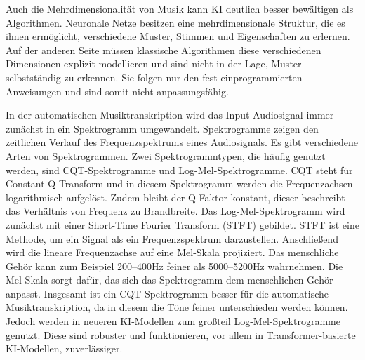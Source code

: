 Auch die Mehrdimensionalität von Musik kann KI deutlich besser bewältigen als Algorithmen.
Neuronale Netze besitzen eine mehrdimensionale Struktur, die es ihnen ermöglicht,
verschiedene Muster, Stimmen und Eigenschaften zu erlernen.
\cite{graves2007multi}
Auf der anderen Seite müssen klassische Algorithmen diese verschiedenen Dimensionen
explizit modellieren und sind nicht in der Lage, Muster selbstständig zu erkennen.
Sie folgen nur den fest einprogrammierten Anweisungen und sind somit nicht anpassungsfähig.

In der automatischen Musiktranskription wird das Input Audiosignal immer zunächst in ein Spektrogramm umgewandelt.
Spektrogramme zeigen den zeitlichen Verlauf des Frequenzspektrums eines Audiosignals.
Es gibt verschiedene Arten von Spektrogrammen.
Zwei Spektrogrammtypen, die häufig genutzt werden, sind CQT-Spektrogramme und Log-Mel-Spektrogramme.
CQT steht für Constant-Q Transform und in diesem Spektrogramm werden die Frequenzachsen logarithmisch aufgelöst.
Zudem bleibt der Q-Faktor konstant, dieser beschreibt das Verhältnis von Frequenz zu Brandbreite.
Das Log-Mel-Spektrogramm wird zunächst mit einer Short-Time Fourier Transform (STFT) gebildet.
STFT ist eine Methode, um ein Signal als ein Frequenzspektrum darzustellen.
Anschließend wird die lineare Frequenzachse auf eine Mel-Skala projiziert.
Das menschliche Gehör kann zum Beispiel 200--400Hz feiner als 5000--5200Hz wahrnehmen.
Die Mel-Skala sorgt dafür, das sich das Spektrogramm dem menschlichen Gehör anpasst.
Insgesamt ist ein CQT-Spektrogramm besser für die automatische Musiktranskription,
da in diesem die Töne feiner unterschieden werden können.
Jedoch werden in neueren KI-Modellen zum großteil Log-Mel-Spektrogramme genutzt.
Diese sind robuster und funktionieren, vor allem in Transformer-basierte KI-Modellen, zuverlässiger.

